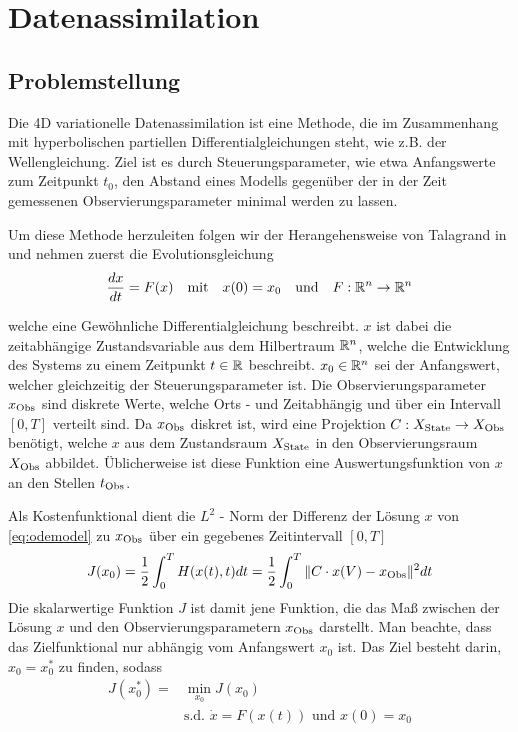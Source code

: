 \chapter{Datenassimilation}
\section{Problemstellung}
Die 4D variationelle Datenassimilation ist eine Methode, die im Zusammenhang mit hyperbolischen partiellen Differentialgleichungen steht, wie z.B. der Wellengleichung. Ziel ist es durch Steuerungsparameter, wie etwa Anfangswerte zum Zeitpunkt $t_0$, den Abstand eines Modells gegenüber der in der Zeit gemessenen Observierungsparameter minimal werden zu lassen. 

Um diese Methode herzuleiten folgen wir der Herangehensweise von Talagrand in \cite{talagrand1987variational} und nehmen zuerst die Evolutionsgleichung
\begin{equation}
\label{eq:odemodel}
 \frac{dx}{dt} = F(x)\quad \text{mit} \quad x(0) = x_0 \quad \text{und}\quad F:\mathbb{R}^n\to \mathbb{R}^n
\end{equation}
  
welche eine Gewöhnliche Differentialgleichung beschreibt. $x$ ist dabei die zeitabhängige Zustandsvariable aus dem Hilbertraum $\mathbb{R}^n$, welche die Entwicklung des Systems zu einem Zeitpunkt $t\in \mathbb{R}$ beschreibt. 
$x_0 \in \mathbb{R}^n$ sei der Anfangswert, welcher gleichzeitig der Steuerungsparameter ist.
Die Observierungsparameter $x_{\text{Obs}}$ sind diskrete Werte, welche Orts - und Zeitabhängig und über ein Intervall $[0,T]$ verteilt sind. Da $x_{\text{Obs}}$ diskret ist, wird eine Projektion $C:X_{\text{State}}\to X_{\text{Obs}}$ benötigt, welche $x$ aus dem Zustandsraum $X_{\text{State}}$ in den Observierungsraum $X_{\text{Obs}}$ abbildet. Üblicherweise ist diese Funktion eine Auswertungsfunktion von $x$ an den Stellen $t_{\text{Obs}}$.

Als Kostenfunktional dient die $L^2$ - Norm der Differenz der Lösung $x$ von \eqref{eq:odemodel} zu $x_{\text{Obs}}$ über ein gegebenes Zeitintervall $[0,T]$
\begin{equation}
\label{eq:costfunctional}
 J(x_0) = \frac{1}{2}\int_0^T H(x(t),t)dt= \frac{1}{2}\int_0^T \|C\cdot x(V)-x_{\text{Obs}}\|^2dt
\end{equation}
Die skalarwertige Funktion $J$ ist damit jene Funktion, die das Maß zwischen der Lösung $x$ und den Observierungsparametern $x_{\text{Obs}}$ darstellt.
Man beachte, dass das Zielfunktional nur abhängig vom Anfangswert $x_0$ ist. Das Ziel besteht darin, $x_0 = x_0^*$ zu finden, sodass
\begin{equation}
\label{eq:bolzaProblem}
\begin{aligned}
 J(x_0^*) =& \min_{x_0} J(x_0) \\
 &\text{s.d. } \dot x = F(x(t)) \text{ und } x(0) = x_0
\end{aligned}
\end{equation}

